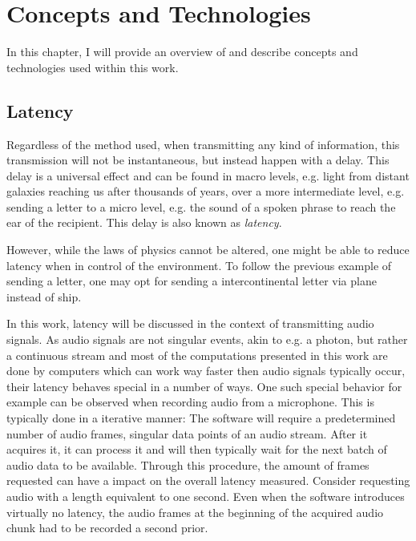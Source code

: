 

\chapter{Concepts and Technologies}
\label{basics:start}
In this chapter, I will provide an overview of and describe concepts and technologies used within this work.




\section{Latency}
\label{basics:latency}
Regardless of the method used, when transmitting any kind of information, this transmission will not be instantaneous, but instead happen with a delay.
This delay is a universal effect and can be found in macro levels, e.g. light from distant galaxies reaching us after thousands of years, over a more intermediate level, e.g. sending a letter to a micro level, e.g. the sound of a spoken phrase to reach the ear of the recipient.
This delay is also known as \textit{latency}.

However, while the laws of physics cannot be altered, one might be able to reduce latency when in control of the environment.
To follow the previous example of sending a letter, one may opt for sending a intercontinental letter via plane instead of ship.

In this work, latency will be discussed in the context of transmitting audio signals.
As audio signals are not singular events, akin to e.g. a photon, but rather a continuous stream and most of the computations presented in this work are done by computers which can work way faster then audio signals typically occur, their latency behaves special in a number of ways. %
One such special behavior for example can be observed when recording audio from a microphone.
This is typically done in a iterative manner:
The software will require a predetermined number of audio frames, singular data points of an audio stream.
After it acquires it, it can process it and will then typically wait for the next batch of audio data to be available.
Through this procedure, the amount of frames requested can have a impact on the overall latency measured.
Consider requesting audio with a length equivalent to one second.
Even when the software introduces virtually no latency, the audio frames at the beginning of the acquired audio chunk had to be recorded a second prior.

